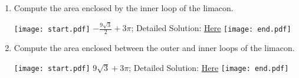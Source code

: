 \documentclass[12pt]{article}
\begin{document}
\begin{enumerate}
\begin{enumerate}

\item Compute the area enclosed by the inner loop of the limacon.

\texttt{[image: start.pdf]}
{{$-\frac{9\sqrt{3}}{2}+3\pi$; Detailed Solution: \textcolor{blue}{\href{http://www.math.drexel.edu/classes/Calculus/resources/Math122HW/Solutions/122_19_Polar_Calc_18.pdf}{Here}}}}
\texttt{[image: end.pdf]}


\item Compute the area enclosed between the outer and inner loops of the limacon.

\texttt{[image: start.pdf]}
{{$9\sqrt{3}+3\pi$; Detailed Solution: \textcolor{blue}{\href{http://www.math.drexel.edu/classes/Calculus/resources/Math122HW/Solutions/122_19_Polar_Calc_18.pdf}{Here}}}}
\texttt{[image: end.pdf]}


\end{enumerate}

\end{enumerate}
\end{document}
